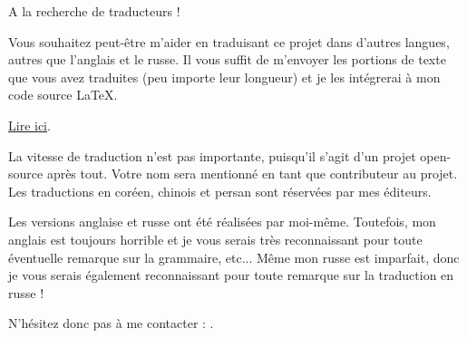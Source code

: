 ﻿\vspace*{\fill}

\Huge A la recherche de traducteurs !

\normalsize

\bigskip
\bigskip
\bigskip

Vous souhaitez peut-être m'aider en traduisant ce projet dans d'autres langues, autres que l'anglais et le russe.
Il vous suffit de m'envoyer les portions de texte que vous avez traduites (peu importe leur longueur) et je les intégrerai à mon code source LaTeX.

\href{\GitHubBlobMasterURL/Translation.md}{Lire ici}.


La vitesse de traduction n'est pas importante, puisqu'il s'agit d'un projet open-source après tout.
Votre nom sera mentionné en tant que contributeur au projet.
Les traductions en coréen, chinois et persan sont réservées par mes éditeurs.

Les versions anglaise et russe ont été réalisées par moi-même.
Toutefois, mon anglais est toujours horrible et je vous serais très reconnaissant pour toute éventuelle remarque sur la grammaire, etc...
Même mon russe est imparfait, donc je vous serais également reconnaissant pour toute remarque sur la traduction en russe !%

N'hésitez donc pas à me contacter : \GTT{\EMAIL}.

\vspace*{\fill}
\vfill
